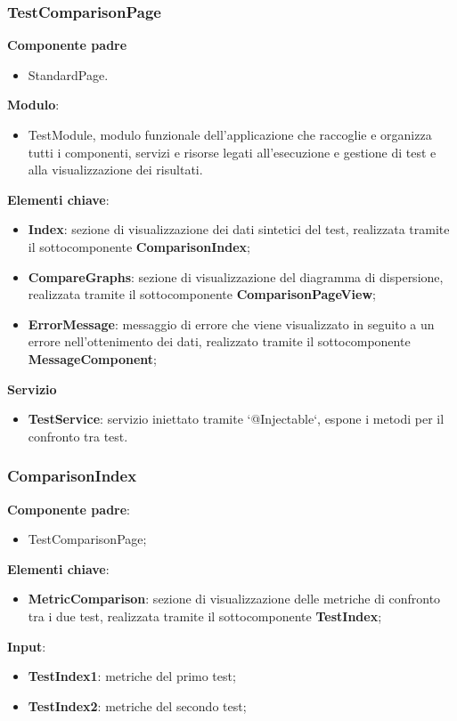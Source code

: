 \subsubsection{TestComparisonPage}  
\textbf{Componente padre}
\begin{itemize}
    \item StandardPage.
\end{itemize}
\textbf{Modulo}:
\begin{itemize}
    \item TestModule, modulo funzionale dell'applicazione che raccoglie e organizza tutti i componenti, servizi e risorse legati all'esecuzione e gestione di test e alla visualizzazione dei risultati.    
\end{itemize}
\textbf{Elementi chiave}:
\begin{itemize}
    \item \textbf{Index}: sezione di visualizzazione dei dati sintetici del test, realizzata tramite il sottocomponente \textbf{ComparisonIndex};
    \item \textbf{CompareGraphs}: sezione di visualizzazione del diagramma di dispersione, realizzata tramite il sottocomponente \textbf{ComparisonPageView};
    \item \textbf{ErrorMessage}: messaggio di errore che viene visualizzato in seguito a un errore nell'ottenimento dei dati, realizzato tramite il sottocomponente \textbf{MessageComponent};
\end{itemize}
\textbf{Servizio}
\begin{itemize}
    \item \textbf{TestService}: servizio iniettato tramite `@Injectable`, espone i metodi per il confronto tra test.
\end{itemize}
\subsubsection{ComparisonIndex} 
\textbf{Componente padre}:
\begin{itemize}
    \item TestComparisonPage;
\end{itemize} 
\textbf{Elementi chiave}:
\begin{itemize}
    \item \textbf{MetricComparison}: sezione di visualizzazione delle metriche di confronto tra i due test, realizzata tramite il sottocomponente \textbf{TestIndex};
\end{itemize}
\textbf{Input}:
\begin{itemize}
    \item \textbf{TestIndex1}: metriche del primo test;
    \item \textbf{TestIndex2}: metriche del secondo test;
\end{itemize}
